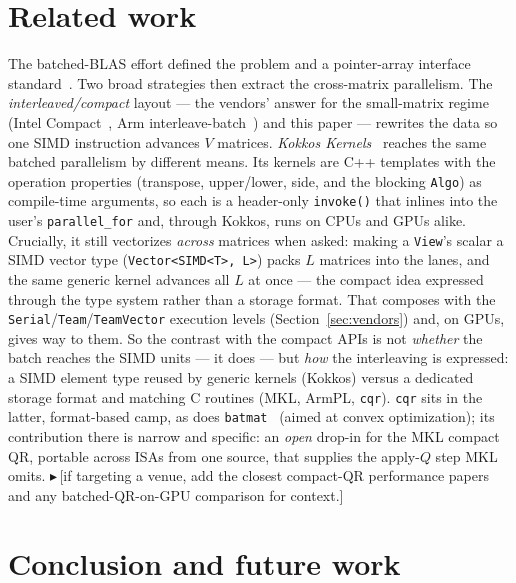 \documentclass[11pt]{article}
\newif\ifdraftmode \draftmodetrue
\newcommand{\draftnote}[1]{\ifdraftmode{\textcolor{orange!85!black}{\small$\blacktriangleright$\,\textsf{[#1]}}}\fi}
\newcommand{\code}[1]{\texttt{#1}}
\newcommand{\cqr}{\mbox{\texttt{cqr}}}
\begin{document}
\section{Related work}
\label{sec:related}

The batched-BLAS effort defined the problem and a pointer-array interface
standard~\cite{bblas2021,bblas-standard}. Two broad strategies then extract the
cross-matrix parallelism. The \emph{interleaved/compact} layout --- the vendors'
answer for the small-matrix regime (Intel Compact~\cite{mkl-compact}, Arm
interleave-batch~\cite{armpl-interleave}) and this paper --- rewrites the data so
one SIMD instruction advances $V$ matrices. \emph{Kokkos
Kernels}~\cite{kokkos-kernels,kokkos-kernels-paper} reaches the same batched
parallelism by different means. Its kernels are C++ templates with the operation
properties (transpose, upper/lower, side, and the blocking \code{Algo}) as
compile-time arguments, so each is a header-only \code{invoke()} that inlines into
the user's \code{parallel\_for} and, through Kokkos, runs on CPUs and GPUs alike.
Crucially, it still vectorizes \emph{across} matrices when asked: making a
\code{View}'s scalar a SIMD vector type (\code{Vector<SIMD<T>,\,L>}) packs $L$
matrices into the lanes, and the same generic kernel advances all $L$ at once ---
the compact idea expressed through the type system rather than a storage format.
That composes with the \code{Serial}/\code{Team}/\code{TeamVector} execution levels
(Section~\ref{sec:vendors}) and, on GPUs, gives way to them. So the contrast with
the compact APIs is not \emph{whether} the batch reaches the SIMD units --- it
does --- but \emph{how} the interleaving is expressed: a SIMD element type reused
by generic kernels (Kokkos) versus a dedicated storage format and matching C
routines (MKL, ArmPL, \cqr{}). \cqr{} sits in the latter, format-based camp, as
does \code{batmat}~\cite{batmat} (aimed at convex optimization); its contribution
there is narrow and specific: an \emph{open} drop-in for the MKL compact QR,
portable across ISAs from one source, that supplies the apply-$Q$ step MKL omits. \draftnote{if targeting a venue, add the closest
compact-QR performance papers and any batched-QR-on-GPU comparison for context.}

\section{Conclusion and future work}
\label{sec:future}
\end{document}
